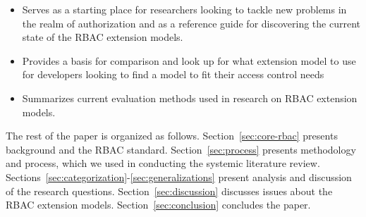 \begin{itemize}
\setlength{\itemsep}{0.25pt}
\item Serves as a starting place for researchers looking to tackle new problems in the realm of authorization and as a reference guide for discovering
the current state of the RBAC extension models. 
\item Provides a basis for comparison and look up for what extension model to use for developers looking to find a model to fit their access control needs
\item Summarizes current evaluation methods used in research on RBAC extension models.
\end{itemize}

The rest of the paper is organized as follows. 
Section~\ref{sec:core-rbac} presents background and the RBAC standard. 
Section~\ref{sec:process} presents methodology and process, which we used in conducting the systemic literature review. 
Sections~\ref{sec:categorization}-\ref{sec:generalizations} present analysis and discussion of the research questions. 
Section~\ref{sec:discussion} discusses issues about the RBAC extension models.
Section~\ref{sec:conclusion} concludes the paper.
